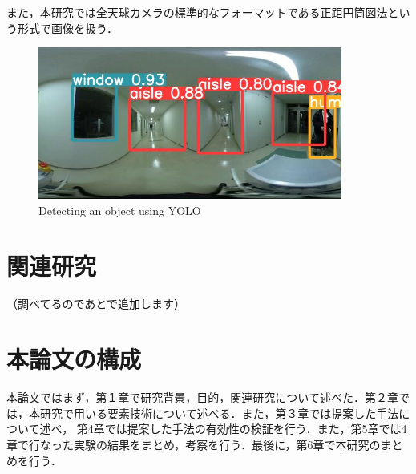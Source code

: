 \documentclass[../main]{subfiles}
\begin{document}
        また，本研究では全天球カメラの標準的なフォーマットである正距円筒図法という形式で画像を扱う．
        
        \begin{figure}[H]
            \centering
            \includegraphics[width=10cm]{../images/yolo_aisle.jpg}
            \caption{Detecting an object using YOLO}
            \label{figure::image_exp}
        \end{figure}
        
        \newpage

        \section{関連研究}
        （調べてるのであとで追加します）
        

        \section{本論文の構成}
        本論文ではまず，第１章で研究背景，目的，関連研究について述べた．第２章では，本研究で用いる要素技術について述べる．また，第３章では提案した手法について述べ，
        第4章では提案した手法の有効性の検証を行う．また，第5章では4章で行なった実験の結果をまとめ，考察を行う．最後に，第6章で本研究のまとめを行う．
\end{document}
